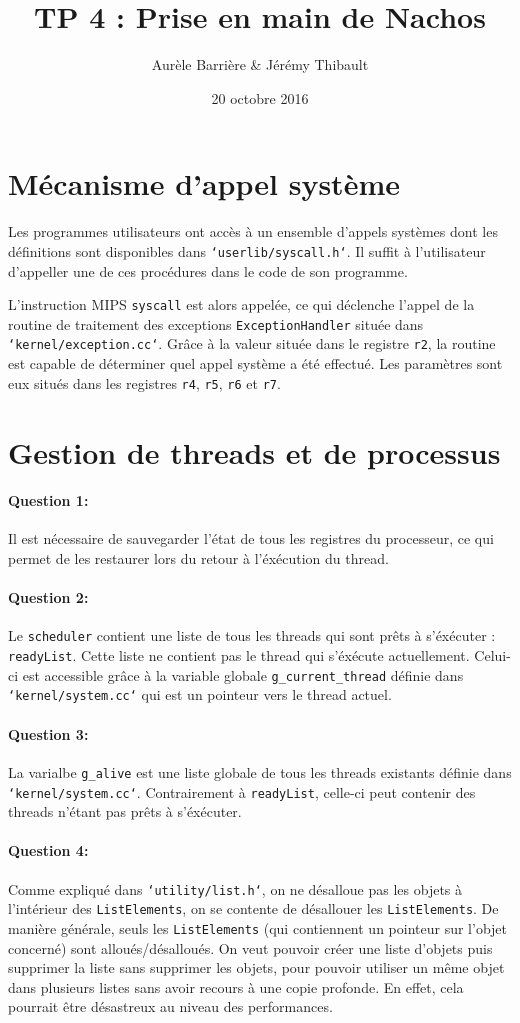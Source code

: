 \documentclass[11pt]{article}
\title{TP 4 : Prise en main de Nachos}
\author{Aurèle Barrière \& Jérémy Thibault}
\date{20 octobre 2016}
\def\question#1{\paragraph{Question #1:}}
\def\pathfile#1{\texttt{`#1`}}
\def\var#1{\texttt{#1}}
\def\func#1{\texttt{#1}}
\def\obj#1{\texttt{#1}}
\begin{document}
\maketitle

\section*{Mécanisme d'appel système}

Les programmes utilisateurs ont accès à un ensemble d'appels systèmes dont les définitions sont disponibles dans \pathfile{userlib/syscall.h}. Il suffit à l'utilisateur d'appeller une de ces procédures dans le code de son programme.

L'instruction MIPS \func{syscall} est alors appelée, ce qui déclenche l'appel de la routine de traitement des exceptions \func{ExceptionHandler} située dans \pathfile{kernel/exception.cc}. Grâce à la valeur située dans le registre \var{r2}, la routine est capable de déterminer quel appel système a été effectué. Les paramètres sont eux situés dans les registres \var{r4}, \var{r5}, \var{r6} et \var{r7}.


\section*{Gestion de threads et de processus}
\question{1} Il est nécessaire de sauvegarder l'état de tous les registres du processeur, ce qui permet de les restaurer lors du retour à l'éxécution du thread.

\question{2} Le \obj{scheduler} contient une liste de tous les threads qui sont prêts à s'éxécuter : \var{readyList}. Cette liste ne contient pas le thread qui s'éxécute actuellement. Celui-ci est accessible grâce à la variable globale \var{g\_current\_thread} définie dans \pathfile{kernel/system.cc} qui est un pointeur vers le thread actuel.

\question{3} La varialbe \var{g\_alive} est une liste globale de tous les threads existants définie dans \pathfile{kernel/system.cc}. Contrairement à \var{readyList}, celle-ci peut contenir des threads n'étant pas prêts à s'éxécuter.

\question{4}
Comme expliqué dans \pathfile{utility/list.h}, on ne désalloue pas les objets à l'intérieur des \obj{ListElements}, on se contente de désallouer les \obj{ListElements}. De manière générale, seuls les \obj{ListElements} (qui contiennent un pointeur sur l'objet concerné) sont alloués/désalloués. On veut pouvoir créer une liste d'objets puis supprimer la liste sans supprimer les objets, pour pouvoir utiliser un même objet dans plusieurs listes sans avoir recours à une copie profonde. En effet, cela pourrait être désastreux au niveau des performances.
\end{document}
